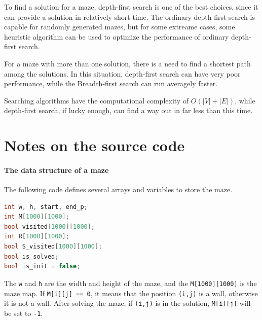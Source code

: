 \documentclass[cn,black,12pt,normal]{elegantnote}
\begin{document}
To find a solution for a maze, depth-first search is one of the best choices, since it can provide a solution in relatively short time. The ordinary depth-first search is capable for randomly generated mazes, but for some extreame cases, some heuristic algorithm can be used to optimize the performance of ordinary depth-first search.

For a maze with more than one solution, there is a need to find a shortest path among the solutions. In this situation, depth-first search can have very poor performance, while the Breadth-first search can run averagely faster.

Searching algorithms have the computational complexity of ${\displaystyle O(|V|+|E|)}$, while depth-first search, if lucky enough, can find a way out in far less than this time.

\section{Notes on the source code}

\paragraph{The data structure of a maze} The following code defines several arrays and variables to store the maze.
\begin{lstlisting}[language = C++]
int w, h, start, end_p;
int M[1000][1000];
bool visited[1000][1000];
int R[1000][1000];
bool S_visited[1000][1000];
bool is_solved;
bool is_init = false;
\end{lstlisting}
The \lstinline{w} and \lstinline{h} are the width and height of the maze, and the \lstinline{M[1000][1000]} is the maze map. If \lstinline{M[i][j] == 0}, it means that the position \lstinline{(i,j)} is a wall, otherwise it is not a wall. After solving the maze, if \lstinline{(i,j)} is in the solution, \lstinline{M[i][j]} will be set to \lstinline{-1}.
\end{document}
